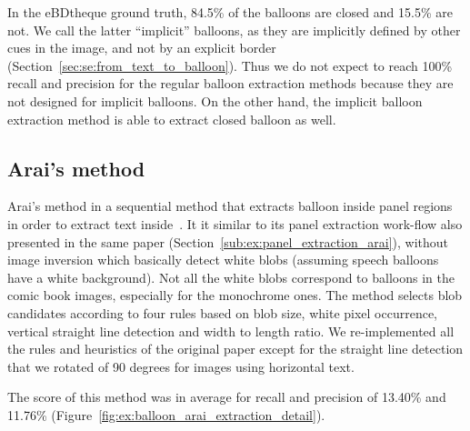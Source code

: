 In the eBDtheque ground truth, 84.5\% of the balloons are closed and 15.5\% are not.
We call the latter ``implicit'' balloons, as they are implicitly defined by other cues in the image, and not by an explicit border (Section~\ref{sec:se:from_text_to_balloon}).
Thus we do not expect to reach 100\% recall and precision for the regular balloon extraction methods because they are not designed for implicit balloons.
On the other hand, the implicit balloon extraction method is able to extract closed balloon as well.



\subsection{Arai's method} %
\label{sub:ex:balloon_extraction_arai}

Arai's method in a sequential method that extracts balloon inside panel regions in order to extract text inside~\cite{Arai11}.
It it similar to its panel extraction work-flow also presented in the same paper (Section~\ref{sub:ex:panel_extraction_arai}), without image inversion which basically detect white blobs (assuming speech balloons have a white background).
Not all the white blobs correspond to balloons in the comic book images, especially for the monochrome ones.
The method selects blob candidates according to four rules based on blob size, white pixel occurrence, vertical straight line detection and width to length ratio.
We re-implemented all the rules and heuristics of the original paper except for the straight line detection that we rotated of 90 degrees for images using horizontal text.

The score of this method was in average for recall and precision of 13.40\% and 11.76\% (Figure~\ref{fig:ex:balloon_arai_extraction_detail}).



